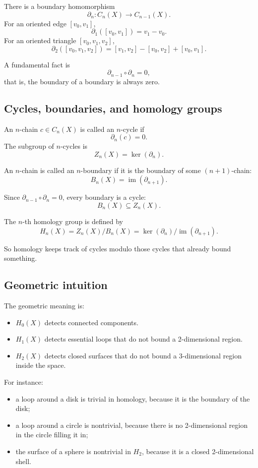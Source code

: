 \documentclass[12pt,a4paper]{article}
\theoremstyle{notespace}
\begin{document}
There is a boundary homomorphism
\[
\partial_n:C_n(X)\longrightarrow C_{n-1}(X).
\]
For an oriented edge \([v_0,v_1]\),
\[
\partial_1([v_0,v_1])=v_1-v_0.
\]
For an oriented triangle \([v_0,v_1,v_2]\),
\[
\partial_2([v_0,v_1,v_2])
=
[v_1,v_2]-[v_0,v_2]+[v_0,v_1].
\]

A fundamental fact is
\[
\partial_{n-1}\circ \partial_n=0,
\]
that is, the boundary of a boundary is always zero.

\subsection{Cycles, boundaries, and homology groups}

An \(n\)-chain \(c\in C_n(X)\) is called an \(n\)-cycle if
\[
\partial_n(c)=0.
\]
The subgroup of \(n\)-cycles is
\[
Z_n(X)=\ker(\partial_n).
\]

An \(n\)-chain is called an \(n\)-boundary if it is the boundary of some \((n+1)\)-chain:
\[
B_n(X)=\operatorname{im}(\partial_{n+1}).
\]

Since \(\partial_{n-1}\circ \partial_n=0\), every boundary is a cycle:
\[
B_n(X)\subseteq Z_n(X).
\]

The \(n\)-th homology group is defined by
\[
H_n(X)=Z_n(X)/B_n(X)=\ker(\partial_n)/\operatorname{im}(\partial_{n+1}).
\]

So homology keeps track of cycles modulo those cycles that already bound something.

\subsection{Geometric intuition}

The geometric meaning is:

\begin{itemize}
	\item \(H_0(X)\) detects connected components.
	\item \(H_1(X)\) detects essential loops that do not bound a 2-dimensional region.
	\item \(H_2(X)\) detects closed surfaces that do not bound a 3-dimensional region inside the space.
\end{itemize}

For instance:
\begin{itemize}
	\item a loop around a disk is trivial in homology, because it is the boundary of the disk;
	\item a loop around a circle is nontrivial, because there is no 2-dimensional region in the circle filling it in;
	\item the surface of a sphere is nontrivial in \(H_2\), because it is a closed 2-dimensional shell.
\end{itemize}
\end{document}
